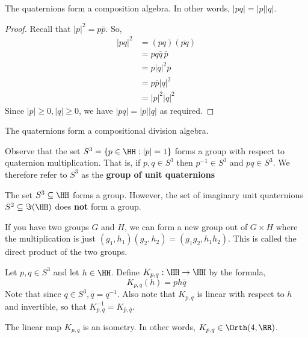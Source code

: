 \begin{lemma}
    The quaternions form a composition algebra. In other words, $|pq| = |p||q|$.
\end{lemma}
\begin{proof}
Recall that $|p|^2 = p\overline{p}$. So,
    \begin{align*}
        |pq|^2 &= (pq)(\overline{pq})\\
        &= pq\overline{q}\,\overline{p}\\
        &=p|q|^2\overline{p}\\
        &= p\overline{p}|q|^2\\
        &=|p|^2|q|^2
    \end{align*}
    Since $|p|\geq 0,|q|\geq 0$, we have $|pq|=|p||q|$ as required.
\end{proof}
\begin{cor}
    The quaternions form a compositional division algebra.
\end{cor}
\begin{defn}
    Observe that the set $S^3 = \{p \in \HH : |p|=1\}$ forms a group with respect to quaternion multiplication. That is, if $p,q\in S^3$ then $p^{-1}\in S^3$ and $pq \in S^3$. We therefore refer to $S^3$ as the \textbf{group of unit quaternions}
\end{defn}
\begin{remark*}
    The set $S^3 \subseteq \HH$ forms a group. However, the set of imaginary unit quaternions $S^2 \subseteq \Im(\HH)$ does \textbf{not} form a group.
\end{remark*}
\begin{remark*}
    If you have two groups $G$ and $H$, we can form a new group out of $G\times H$ where the multiplication is just $(g_1,h_1)(g_2,h_2) = (g_1g_2,h_1h_2)$. This is called the direct product of the two groups. 
\end{remark*}
\begin{defn}
    Let $p,q\in S^3$ and let $h\in \HH$. Define $K_{p,q} : \HH \to \HH$ by the formula,
\[K_{p,q}(h) = ph\overline{q}\]
Note that since $q\in S^3, \overline{q}=q^{-1}$. Also note that $K_{p,q}$ is linear with respect to $h$ and invertible, so that $K^{-1}_{p,q} = K_{\overline{p},\overline{q}}$.
\end{defn}
\begin{lemma}
    The linear map $K_{p,q}$ is an isometry. In other words, $K_{p,q} \in \Orth(4,\RR)$.
\end{lemma}
